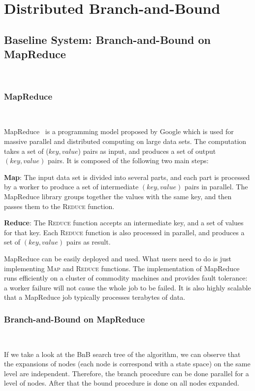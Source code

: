 \section{Distributed Branch-and-Bound}

\subsection{Baseline System: Branch-and-Bound on MapReduce}\

\subsubsection{MapReduce}\

\noindent MapReduce~\cite[]{dean2008mapreduce} is a programming model proposed by Google which is used for massive parallel and distributed computing on large data sets. The computation takes a set of ($key, value$) pairs as input, and produces a set of output $(key, value)$ pairs. It is composed of the following two main steps:

\noindent \textbf{Map}: The input data set is divided into several parts, and each part is processed by a worker to produce a set of intermediate $(key, value)$ pairs in parallel. The MapReduce library groups together the values with the same key, and then passes them to the \textsc{Reduce} function.

\noindent \textbf{Reduce}: The \textsc{Reduce} function accepts an intermediate key, and a set of values for that key. Each \textsc{Reduce} function is also processed in parallel, and produces a set of $(key, value)$ pairs as result.

MapReduce can be easily deployed and used. What users need to do is just implementing \textsc{Map} and \textsc{Reduce} functions. The implementation of MapReduce runs efficiently on a cluster of commodity machines and provides fault tolerance: a worker failure will not cause the whole job to be failed. It is also highly scalable that a MapReduce job typically processes terabytes of data.




\subsubsection{Branch-and-Bound on MapReduce}\

\noindent If we take a look at the BnB search tree of the algorithm, we can observe that the expansions of nodes (each node is correspond with a state space) on the same level are independent. Therefore, the branch procedure can be done parallel for a level of nodes. After that the bound procedure is done on all nodes expanded.

